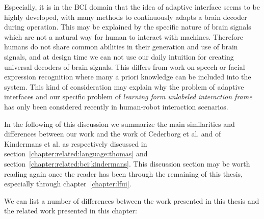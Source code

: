 Especially, it is in the BCI domain that the idea of adaptive interface seems to be highly developed, with many methods to continuously adapts a brain decoder during operation. This may be explained by the specific nature of brain signals which are not a natural way for human to interact with machines. Therefore humans do not share common abilities in their generation and use of brain signals, and at design time we can not use our daily intuition for creating universal decoders of brain signals. This differs from work on speech or facial expression recognition where many a priori knowledge can be included into the system. This kind of consideration may explain why the problem of adaptive interfaces and our specific problem of \emph{learning form unlabeled interaction frame}  has only been considered recently in human-robot interaction scenarios.

In the following of this discussion we summarize the main similarities and differences between our work and the work of Cederborg et al. and of Kindermans et al. as respectively discussed in  section~\ref{chapter:related:language:thomas} and section~\ref{chapter:related:bci:kindermans}. This discussion section may be worth reading again once the reader has been through the remaining of this thesis, especially through chapter~\ref{chapter:lfui}.

We can list a number of differences between the work presented in this thesis and the related work presented in this chapter:

